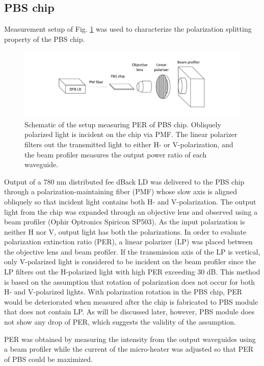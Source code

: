 \documentclass[letterpaper, 10pt]{article}
\begin{document}
\subsection{PBS chip}

Measurement setup of Fig. \ref{fig:setup}  was used to characterize the polarization splitting property of the PBS chip.
\begin{figure}
  \centering
  \includegraphics[width=13cm]{./setup.pdf}
  \caption{Schematic of the setup measuring PER of PBS chip. Obliquely polarized light is incident on the chip via PMF. The linear polarizer filters out the transmitted light to either H- or V-polarization, and the beam profiler measures the output power ratio of each waveguide.}
  \label{fig:setup}
\end{figure}
Output of a 780 nm distributed fee dBack LD was delivered to the PBS chip through a polarization-maintaining fiber (PMF) whose slow axis is aligned obliquely so that incident light contains both H- and V-polarization.
The output light from the chip was expanded through an objective lens and observed using a beam profiler (Ophir Optronics Spiricon SP503).
As the input polarization is neither H nor V, output light has both the polarizations.
In order to evaluate polarization extinction ratio (PER), a linear polarizer (LP) was placed between the objective lens and beam profiler.
If the transmission axis of the LP is vertical, only V-polarized light is considered to be incident on the beam profiler since the LP filters out the H-polarized light with high PER exceeding 30 dB.
This method is based on the assumption that rotation of polarization does not occur for both H- and V-polarized lights.
With polarization rotation in the PBS chip, PER would be deteriorated when measured after the chip is fabricated to PBS module that does not contain LP.
As will be discussed later, however, PBS module does not show any drop of PER, which suggests the validity of the assumption.

PER was obtained by measuring the intensity from the output waveguides using a beam profiler while the current of the micro-heater was adjusted so that PER of PBS could be maximized.
\end{document}
